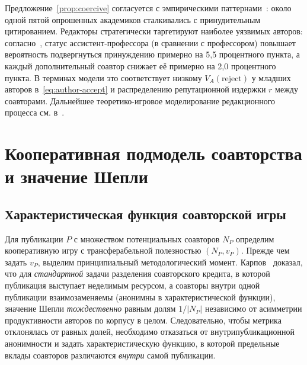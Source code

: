 \documentclass[12pt,a4paper]{article}
\theoremstyle{definition}
\begin{document}
Предложение~\ref{prop:coercive} согласуется с эмпирическими
паттернами~\citep{wilhite2012}: около одной пятой опрошенных
академиков сталкивались с принудительным цитированием. Редакторы
стратегически таргетируют наиболее уязвимых авторов:
согласно~\citep{wilhite2012}, статус ассистент-профессора (в
сравнении с профессором) повышает вероятность подвергнуться
принуждению примерно на 5,5 процентного пункта, а каждый
дополнительный соавтор снижает её примерно на 2,0 процентного пункта.
В терминах модели это соответствует низкому $V_A(\mathrm{reject})$ у
младших авторов в~\eqref{eq:author-accept} и распределению
репутационной издержки $r$ между соавторами. Дальнейшее
теоретико-игровое моделирование редакционного процесса см.
в~\citep{garcia2015authored}.

\section{Кооперативная подмодель соавторства и значение Шепли}
\label{sec:shapley}

\subsection{Характеристическая функция соавторской игры}

Для публикации $P$ с множеством потенциальных соавторов $N_P$
определим кооперативную игру с трансферабельной полезностью $(N_P,
v_P)$. Прежде чем задать $v_P$, выделим принципиальный
методологический момент. Карпов~\citep{karpov2014} доказал, что для
\emph{стандартной} задачи разделения соавторского кредита, в которой
публикация выступает неделимым ресурсом, а соавторы внутри одной
публикации взаимозаменяемы (анонимны в характеристической функции),
значение Шепли \emph{тождественно} равным долям $1/|N_P|$ независимо
от асимметрии продуктивности авторов по корпусу в целом.
Следовательно, чтобы метрика отклонялась от равных долей, необходимо
отказаться от внутрипубликационной анонимности и задать
характеристическую функцию, в которой предельные вклады соавторов
различаются \emph{внутри} самой публикации.
\end{document}

